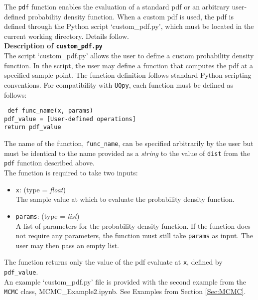 \documentclass[./UsersGuide.tex]{subfiles}
\begin{document}
\noindent The \texttt{pdf} function enables the evaluation of a standard pdf or an arbitrary user-defined probability density function. When a custom pdf is used, the pdf is defined through the Python script `custom\_pdf.py', which must be located in the current working directory. Details follow.\\

\noindent\textbf{Description of \texttt{custom\_pdf.py}}\\

\noindent The script `custom\_pdf.py' allows the user to define a custom probability density function. In the script, the user may define a function that computes the pdf at a specified sample point. The function definition follows standard Python scripting conventions. For compatibility with \texttt{UQpy}, each function must be defined as follows:

\vspace{4mm}
\texttt{{\color{blue} def} func\_name(x, params)}\\
\hspace*{1.3cm} \texttt{pdf\_value = [User-defined operations]}\\
\hspace*{1.3cm} \texttt{return pdf\_value}
\vspace{4mm}

\noindent The name of the function, \texttt{func\_name}, can be specified arbitrarily by the user but must be identical to the name provided as a {\it string} to the value of \texttt{dist} from the \texttt{pdf} function described above.\\

\noindent The function is required to take two inputs: 
\begin{itemize}
\item \texttt{x}: (type = {\it float})\\ 
	The sample value at which to evaluate the probability density function.
\item \texttt{params}: (type = {\it list})\\
	A list of parameters for the probability density function. If the function does not require any parameters, the function must still take \texttt{params} as input. The user may then pass an 	empty list.
\end{itemize}

\noindent The function returns only the value of the pdf evaluate at \texttt{x}, defined by \texttt{pdf\_value}.\\

\noindent An example `custom\_pdf.py' file is provided with the second example from the \texttt{MCMC} class, MCMC\_Example2.ipynb. See Examples from Section \ref{Sec:MCMC}.
\end{document}
